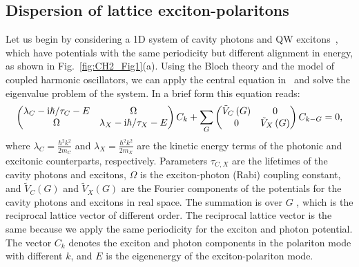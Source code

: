 \subsection{Dispersion of lattice exciton-polaritons}
Let us begin by considering a 1D system of cavity photons and QW excitons~\cite{Tanese:2013aa}, which have potentials with the same periodicity but different alignment in energy, as shown in Fig.~\ref{fig:CH2_Fig1}(a).
Using the Bloch theory and the model of coupled harmonic oscillators, we can apply the central equation in~\cite{kittel:1966aa} and solve the eigenvalue problem of the system.
In a brief form this equation reads:
%
\begin{eqnarray}
	\begin{pmatrix}
		\lambda_{C}-\mathrm{i}\hbar/\tau_C-E & \Omega \\
		\Omega & \lambda_{X}-\mathrm{i}\hbar/ \tau_X -E
	\end{pmatrix}
	C_k
	 + \sum_{G}
	\begin{pmatrix}
		\tilde{V}_{C}\left( G \right) & 0 \\
		0 & \tilde{V}_X\left( G \right)
	\end{pmatrix}
	C_{k-G}=0,
	\label{eq:CH2_SP1}
\end{eqnarray}
%
where $\lambda_{C}=\frac{\hbar^{2}k^{2}}{2m_{C}}$ and $\lambda_{X}=\frac{\hbar^{2}k^{2}}{2m_{X}}$ are the kinetic energy terms of the photonic and excitonic counterparts, respectively.
Parameters $\tau_{C,X}$ are the lifetimes of the cavity photons and excitons, $\Omega$ is the exciton-photon (Rabi) coupling constant, and $\tilde{V}_C\left( G \right)$ and $\tilde{V}_{X}\left( G \right)$ are the Fourier components of the potentials for the cavity photons and excitons in real space.
The summation is over $G$ , which is the reciprocal lattice vector of different order.
The reciprocal lattice vector is the same because we apply the same periodicity for the exciton and photon potential. The vector $C_{k}$ denotes the exciton and photon components in the polariton mode with different $k$, and $E$ is the eigenenergy of the exciton-polariton mode.

